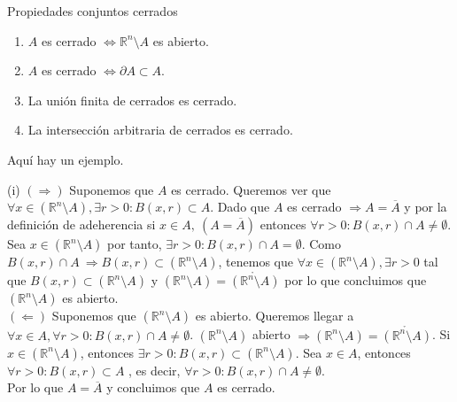 \begin{prop}
Propiedades conjuntos cerrados
\begin{enumerate}[label=(\roman*)]
    \item $A$ es cerrado $\Leftrightarrow \mathbb{R}^n\setminus A $ es abierto.
    \item $A$ es cerrado $\Leftrightarrow \partial{A} \subset A$.
    \item La unión finita de cerrados es cerrado.
    \item La intersección arbitraria de cerrados es cerrado.
\end{enumerate}
\end{prop}

\begin{ejm}
Aquí hay un ejemplo.
\end{ejm}

\begin{dem}(i)
    $(\Rightarrow)$ Suponemos que $A$ es cerrado. Queremos ver que $\forall x\in (\mathbb{R}^n\setminus A), \exists r>0: B(x,r)\subset A$. Dado que $A$ es cerrado $\Rightarrow A = \overline{A}$ y por la definición de adeherencia si $x\in A, \ (A = \overline{A})$ entonces $\forall r>0: B(x,r)\cap A \neq \emptyset$. Sea $x \in (\mathbb{R}^n\setminus A)$ por tanto, $\exists r>0: B(x,r)\cap A = \emptyset$. Como $B(x,r)\cap A \ \Rightarrow B(x,r)\subset (\mathbb{R}^n\setminus A)$, tenemos que $\forall x \in (\mathbb{R}^n\setminus A), \exists r > 0$ tal que $B(x,r)\subset (\mathbb{R}^n\setminus A)$ y $(\mathbb{R}^n\setminus A) = \mathring{(\mathbb{R}^n\setminus A)} $ por lo que concluimos que $(\mathbb{R}^n\setminus A)$ es abierto.\\
    
    $(\Leftarrow)$ Suponemos que $(\mathbb{R}^n\setminus A)$ es abierto. Queremos llegar a \\$\forall x\in A, \forall r > 0: B(x,r)\cap A \neq \emptyset$. $(\mathbb{R}^n\setminus A)$ abierto $\Rightarrow (\mathbb{R}^n\setminus A) = \mathring{(\mathbb{R}^n\setminus A)}$. Si $x\in (\mathbb{R}^n\setminus A)$, entonces $\exists r>0: B(x,r)\subset (\mathbb{R}^n\setminus A)$. Sea $x \in A$, entonces $\forall r>0: B(x,r)\subset A$ , es decir, $\forall r>0: B(x,r)\cap A \neq \emptyset$. \\ Por lo que $A = \overline{A}$  y concluimos que $A$ es cerrado.
\end{dem}

